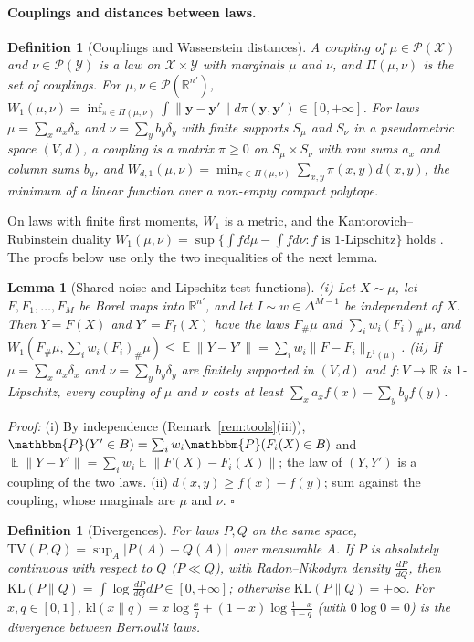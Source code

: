 \documentclass{article}
\DeclareMathOperator{\E}{\mathbb{E}}
\newcommand{\RR}{\mathbb{R}}
\newcommand{\PP}{\mathbbm{P}}
\newcommand{\by}{\mathbf{y}}
\newcommand{\TV}{\mathrm{TV}}
\newcommand{\KL}{\mathrm{KL}}
\newcommand{\kl}{\mathrm{kl}}
\theoremstyle{plain}
\newtheorem{lemma}[theorem]{Lemma}
\newtheorem{definition}[theorem]{Definition}
\theoremstyle{remark}
\begin{document}
\paragraph{Couplings and distances between laws.}

\begin{definition}[Couplings and Wasserstein distances]\label{def:wasserstein}
A \emph{coupling} of $\mu\in\mathcal P(\mathcal X)$ and $\nu\in\mathcal P(\mathcal Y)$ is a law on $\mathcal X\times\mathcal Y$ with marginals $\mu$ and $\nu$, and $\Pi(\mu,\nu)$ is
the set of couplings. For $\mu,\nu\in\mathcal P(\RR^{n'})$, $W_1(\mu,\nu)=\inf_{\pi\in\Pi(\mu,\nu)}\int\|\by-\by'\|d\pi(\by,\by')\in[0,+\infty]$. For laws
$\mu=\sum_xa_x\delta_x$ and $\nu=\sum_yb_y\delta_y$ with finite supports $S_\mu$ and $S_\nu$ in a pseudometric space $(V,d)$, a coupling is a matrix
$\pi\ge0$ on $S_\mu\times S_\nu$ with row sums $a_x$ and column sums $b_y$, and $W_{d,1}(\mu,\nu)=\min_{\pi\in\Pi(\mu,\nu)}\sum_{x,y}\pi(x,y)d(x,y)$, the
minimum of a linear function over a non-empty compact polytope.
\end{definition}

On laws with finite first moments, $W_1$ is a metric, and the Kantorovich--Rubinstein duality
$W_1(\mu,\nu)=\sup\{\int fd\mu-\int fd\nu:f\text{ is }1\text{-Lipschitz}\}$ holds \citep[Chs.~5--6]{villani2009optimal}. The proofs below use only the
two inequalities of the next lemma.

\begin{lemma}[Shared noise and Lipschitz test functions]\label{lem:coupling_bounds}
(i) Let $X\sim\mu$, let $F,F_1,\dots,F_M$ be Borel maps into $\RR^{n'}$, and let $I\sim w\in\Delta^{M-1}$ be independent of $X$. Then $Y=F(X)$ and
$Y'=F_I(X)$ have the laws $F_\#\mu$ and $\sum_iw_i(F_i)_\#\mu$, and
$W_1(F_\#\mu,\sum_iw_i(F_i)_\#\mu)\le\E\|Y-Y'\|=\sum_iw_i\|F-F_i\|_{L^1(\mu)}$.
(ii) If $\mu=\sum_xa_x\delta_x$ and $\nu=\sum_yb_y\delta_y$ are finitely supported in $(V,d)$ and $f:V\to\RR$ is $1$-Lipschitz, every coupling of $\mu$
and $\nu$ costs at least $\sum_xa_xf(x)-\sum_yb_yf(y)$.
\end{lemma}
\textit{Proof:}
(i) By independence (Remark~\ref{rem:tools}(iii)), $\PP(Y'\in B)=\sum_iw_i\PP(F_i(X)\in B)$ and $\E\|Y-Y'\|=\sum_iw_i\E\|F(X)-F_i(X)\|$; the law of
$(Y,Y')$ is a coupling of the two laws. (ii) $d(x,y)\ge f(x)-f(y)$; sum against the coupling, whose marginals are $\mu$ and $\nu$.
\hfill$\square$

\begin{definition}[Divergences]\label{def:divergences}
For laws $P,Q$ on the same space, $\TV(P,Q)=\sup_A|P(A)-Q(A)|$ over measurable $A$. If $P$ is absolutely continuous with respect to $Q$
($P\ll Q$), with Radon--Nikodym density $\frac{dP}{dQ}$, then $\KL(P\|Q)=\int\log\frac{dP}{dQ}dP\in[0,+\infty]$; otherwise $\KL(P\|Q)=+\infty$. For
$x,q\in[0,1]$, $\kl(x\|q)=x\log\frac xq+(1-x)\log\frac{1-x}{1-q}$ (with $0\log0=0$) is the divergence between Bernoulli laws.
\end{definition}
\end{document}
